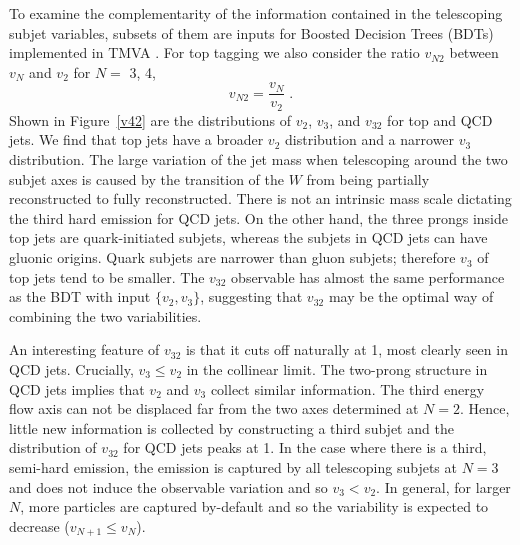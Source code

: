 \documentclass[aps,prl,floatfix,preprintnumbers,twocolumn,groupedaddress,nofootinbib]{revtex4-1}
\newcommand{\be}{\begin{equation}}
\newcommand{\ee}{\end{equation}}
\begin{document}
To examine the complementarity of the information contained in the telescoping subjet variables, subsets of them are inputs for Boosted Decision Trees (BDTs) implemented in \textsc{TMVA} \cite{Hocker:2007ht}. For top tagging we also consider the ratio $v_{N2}$ between $v_N$ and $v_2$ for $N = $ 3, 4,
\be
    v_{N2}=\frac{v_N}{v_2}\;.
\ee
Shown in Figure~\ref{v42} are the distributions of $v_2$, $v_3$, and $v_{32}$ for top and QCD jets. We find that top jets have a broader $v_2$ distribution and a narrower $v_3$ distribution. The large variation of the jet mass when telescoping around the two subjet axes is caused by the transition of the $W$ from being partially reconstructed to fully reconstructed. There is not an intrinsic mass scale dictating the third hard emission for QCD jets. On the other hand, the three prongs inside top jets are quark-initiated subjets, whereas the subjets in QCD jets can have gluonic origins. Quark subjets are narrower than gluon subjets; therefore $v_3$ of top jets tend to be smaller. The $v_{32}$ observable has almost the same performance as the BDT with input $\{v_2,v_3\}$, suggesting that $v_{32}$ may be the optimal way of combining the two variabilities.

An interesting feature of $v_{32}$ is that it cuts off naturally at 1, most clearly seen in QCD jets. Crucially, $v_{3} \leq v_{2}$ in the collinear limit. The two-prong structure in QCD jets implies that $v_{2}$ and $v_{3}$ collect similar information. The third energy flow axis can not be displaced far from the two axes determined at $N=2$. Hence, little new information is collected by constructing a third subjet and the distribution of $v_{32}$ for QCD jets peaks at 1. In the case where there is a third, semi-hard emission, the emission is captured by all telescoping subjets at $N=3$ and does not induce the observable variation and so $v_{3} < v_{2}$. In general, for larger $N$, more particles are captured by-default and so the variability is expected to decrease ($v_{N+1}\leq v_{N}$).
\end{document}
